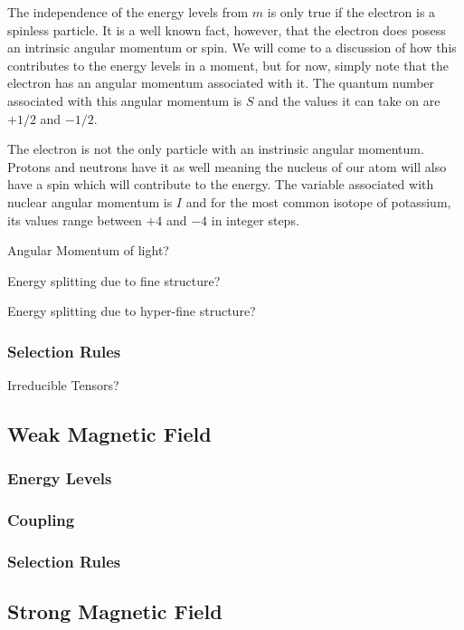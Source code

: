 \documentclass[letter,12pt]{article}
\begin{document}
        The independence of the energy levels from $m$ is only true
        if the electron is a spinless particle. It is a well known
        fact, however, that the electron does posess an intrinsic 
        angular momentum or spin. We will come to a discussion of 
        how this contributes to the energy levels in a moment, but 
        for now, simply note that the electron has an angular 
        momentum associated with it. The quantum number associated
        with this angular momentum is $S$ and the values it can take 
        on are $+1/2$ and $-1/2$.

        The electron is not the only particle with an instrinsic
        angular momentum. Protons and neutrons have it as well
        meaning the nucleus of our atom will also have a
        spin which will contribute to the energy. The variable
        associated with nuclear angular momentum is $I$ and
        for the most common isotope of potassium, its values
        range between $+4$ and $-4$ in integer steps. 

        Angular Momentum of light?

        Energy splitting due to fine structure?

        Energy splitting due to hyper-fine structure?

		\subsubsection{Selection Rules}\label{selectionRules}

        Irreducible Tensors?

	\subsection{Weak Magnetic Field}
		\subsubsection{Energy Levels}
		\subsubsection{Coupling}
		\subsubsection{Selection Rules}

	\subsection{Strong Magnetic Field}
\end{document}
